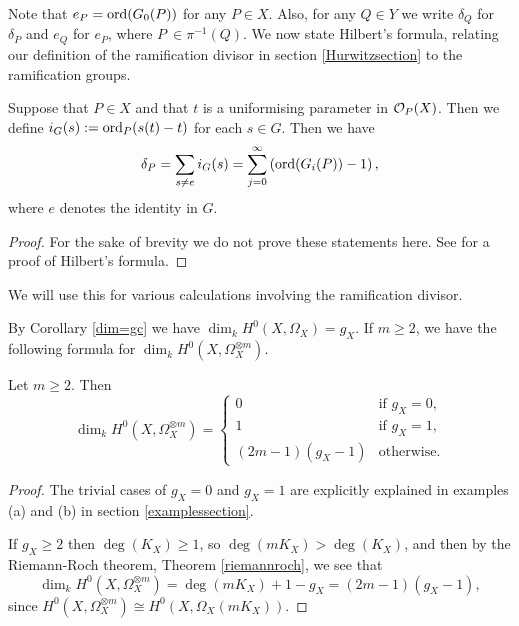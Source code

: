 Note that $e_P = \operatorname{ord} (G_0(P))$ for any $P \in X$.
Also, for any $Q \in Y$ we write $\delta_Q$ for $\delta_P$ and $e_Q$ for $e_P$, where $P\ \in \pi^{-1}(Q)$.
We now state Hilbert's formula, relating our definition of the ramification divisor in section \ref{Hurwitzsection} to the ramification groups.


\begin{thm}\label{hilbertsformula}
Suppose that $P\in X$ and that $t$ is a uniformising parameter in ${\cal O}_{P}(X)$.
Then we define $i_G(s):=\operatorname{ord}_{P}(s(t)-t)$ for each $s\in G$.
Then we have
\begin{equation}
\delta_P = \sum_{s\neq e}i_G(s)=\sum_{j=0}^{\infty}\left(\operatorname{ord}(G_i(P))-1\right),\label{ramdiv}
\end{equation}
where $e$ denotes the identity in $G$.
\end{thm}
\begin{proof}
For the sake of brevity we do not prove these statements here. See \cite[Chap. IV, \S 1, Prop. 4]{localfields} for a proof of Hilbert's formula.
\end{proof}

We will use this for various calculations involving the ramification divisor.


By Corollary \ref{dim=gc} we have $\dim_kH^0(X,\Omega_X)=g_X$.
If $m\geq 2$, we have the following formula for $\dim_kH^0(X,\Omega_X^{\otimes m})$.



\begin{lem}\label{dim3}
Let $m\geq 2$. Then
\begin{equation}
\dim_kH^0(X,\Omega_X^{\otimes m}) =
\begin{cases}
0 & \mbox{if } g_X=0,\\
1 & \mbox{if } g_X=1,\\
(2m-1)(g_X-1) & \mbox{otherwise}.
\end{cases}
\end{equation}
\end{lem}
\begin{proof}
The trivial cases of $g_X =0$ and $g_X=1$ are explicitly explained in examples (a) and (b) in section \ref{examplessection}.

If $g_X\geq 2$ then $\deg(K_X)\geq1$, so $\deg(mK_X)>\deg(K_X)$, and then by the Riemann-Roch theorem, Theorem \ref{riemannroch}, we see that 
\[ \dim_kH^0(X,\Omega_X^{\otimes m})=\deg(mK_X)+1-g_X=(2m-1)(g_X-1),\]
since $H^0(X,\Omega_X^{\otimes m}) \cong H^0(X,\Omega_X(mK_X))$.
\end{proof}


